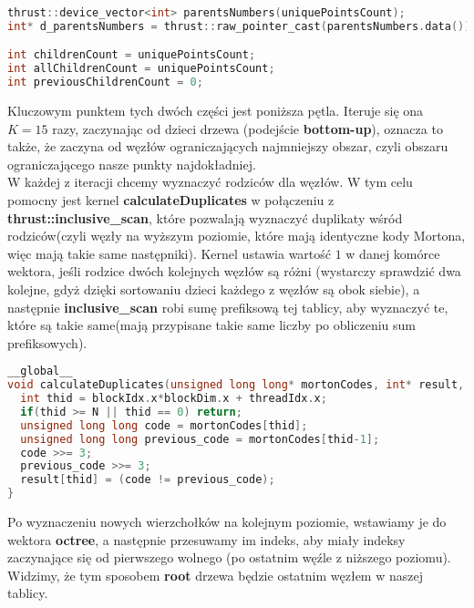 \documentclass[14pt,twoside,a4paper]{article}
\theoremstyle{definition}
\begin{document}
\begin{lstlisting}[language=C++, frame=single, framerule=2pt, caption=Przechowywanie węzłów drzewa]
thrust::device_vector<int> parentsNumbers(uniquePointsCount);
int* d_parentsNumbers = thrust::raw_pointer_cast(parentsNumbers.data());

int childrenCount = uniquePointsCount;
int allChildrenCount = uniquePointsCount;
int previousChildrenCount = 0;
\end{lstlisting}
\bigskip
Kluczowym punktem tych dwóch części jest poniższa pętla. Iteruje się ona $K=15$ razy, zaczynając od dzieci drzewa (podejście \textbf{bottom-up}), oznacza to także, że zaczyna od węzłów ograniczających najmniejszy obszar, czyli obszaru ograniczającego nasze punkty najdokładniej.\\
\bigskip
W każdej z iteracji chcemy wyznaczyć rodziców dla węzłów. W tym celu pomocny jest kernel \textbf{calculateDuplicates} w połączeniu z \textbf{thrust::inclusive\_scan}, które pozwalają wyznaczyć duplikaty wśród rodziców(czyli węzły na wyższym poziomie, które mają identyczne kody Mortona, więc mają takie same następniki).
Kernel ustawia wartość $1$ w danej komórce wektora, jeśli rodzice dwóch kolejnych węzłów są różni (wystarczy sprawdzić dwa kolejne, gdyż dzięki sortowaniu dzieci każdego z węzłów są obok siebie), a następnie \textbf{inclusive\_scan} robi sumę prefiksową tej tablicy, aby wyznaczyć te, które są takie same(mają przypisane takie same liczby po obliczeniu sum prefiksowych).
\bigskip
\bigskip
\bigskip

\begin{lstlisting}[language=C++, frame=single, framerule=2pt, caption=Kernel calculateDuplicates]
__global__
void calculateDuplicates(unsigned long long* mortonCodes, int* result, int N) {
  int thid = blockIdx.x*blockDim.x + threadIdx.x;
  if(thid >= N || thid == 0) return;
  unsigned long long code = mortonCodes[thid];
  unsigned long long previous_code = mortonCodes[thid-1];
  code >>= 3;
  previous_code >>= 3;
  result[thid] = (code != previous_code);
}

\end{lstlisting}
\bigskip
Po wyznaczeniu nowych wierzchołków na kolejnym poziomie, wstawiamy je do wektora \textbf{octree}, a następnie przesuwamy im indeks, aby miały indeksy zaczynające się od pierwszego wolnego (po ostatnim węźle z niższego poziomu). Widzimy, że tym sposobem \textbf{root} drzewa będzie ostatnim węzłem w naszej tablicy.
\end{document}
